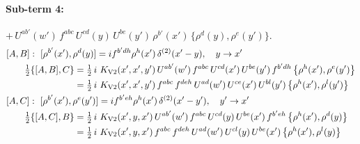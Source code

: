 \documentclass[10pt]{article}
\numberwithin{equation}{section}
\begin{document}
\paragraph{Sub-term 4:} $+\,U^{ab'}(w')\,f^{abc}\,U^{cd}(y)\,U^{be}(y')\,\rho^{b'}(x')\,\big\{\rho^{d}(y),\rho^{e}(y')\big\}$.
\begin{align}
&[A,B]:\ [\rho^{b'}(x'),\rho^{d}(y)]=i f^{b'dh}\rho^{h}(x')\,\delta^{(2)}(x'-y),\quad y\to x'\notag\\
&\qquad \tfrac12\{[A,B],C\}=\tfrac12\,i\,\,K_{\rm V2}(x',x',y')\,U^{ab'}(w')\,f^{abc}\,U^{cd}(x')\,U^{be}(y')\,f^{b'dh}\,\big\{\rho^{h}(x'),\rho^{e}(y')\big\}\notag\\
&\qquad\phantom{\tfrac12\{[A,B],C\}}=\tfrac12\,i\,\,K_{\rm V2}(x',x',y')\,f^{abc}\,f^{deh}\,U^{ad}(w')\,U^{ce}(x')\,U^{bl}(y')\,\big\{\rho^{h}(x'),\rho^{l}(y')\big\}
\label{R:eq:GI.V2-4-AB}\\
&[A,C]:\ [\rho^{b'}(x'),\rho^{e}(y')]=i f^{b'eh}\rho^{h}(x')\,\delta^{(2)}(x'-y'),\quad y'\to x'\notag\\
&\qquad \tfrac12\{[A,C],B\}=\tfrac12\,i\,\,K_{\rm V2}(x',y,x')\,U^{ab'}(w')\,f^{abc}\,U^{cd}(y)\,U^{be}(x')\,f^{b'eh}\,\big\{\rho^{h}(x'),\rho^{d}(y)\big\}\notag\\
&\qquad\phantom{\tfrac12\{[A,C],B\}}=\tfrac12\,i\,\,K_{\rm V2}(x',y,x')\,f^{abc}\,f^{deh}\,U^{ad}(w')\,U^{cl}(y)\,U^{be}(x')\,\big\{\rho^{h}(x'),\rho^{l}(y)\big\}
\label{R:eq:GI.V2-4-AC}
\end{align}
\end{document}
